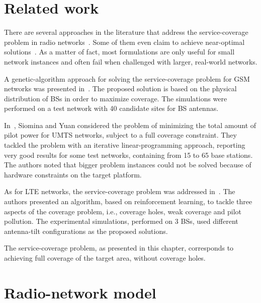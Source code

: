 \section{Related work \label{sec:06-Related-work}}

There are several approaches in the literature that address the service-coverage
problem in radio networks~\cite{Amaldi-Radio_planning_and_coverage_optimization_of_3G_networks:2008,Nawrocki-Understanding_UMTS_radio_network_modelling_and_optimisation:2006,Siomina_Pilot.power.optimization:2004}.
Some of them even claim to achieve near-optimal solutions~\cite{Siomina:Minimum.pilot.power.for.service.coverage}.
As a matter of fact, most formulations are only useful for small network
instances and often fail when challenged with larger, real-world networks.

A genetic-algorithm approach for solving the service-coverage problem
for GSM networks was presented in~\cite{Lieska-Radion_coverage_optimization_with_genetic_algorithms:1998}.
The proposed solution is based on the physical distribution of BSs
in order to maximize coverage. The simulations were performed on a
test network with 40 candidate sites for BS antennas.

In~\cite{Siomina:Minimum.pilot.power.for.service.coverage}, Siomina
and Yuan considered the problem of minimizing the total amount of
pilot power for UMTS networks, subject to a full coverage constraint.
They tackled the problem with an iterative linear-programming approach,
reporting very good results for some test networks, containing from
15 to 65 base stations. The authors noted that bigger problem instances
could not be solved because of hardware constraints on the target
platform.

As for LTE networks, the service-coverage problem was addressed in~\cite{Thampi-A_sparse_sampling_algorithm_for_self_optimization_of_coverage_in_LTE:2012}.
The authors presented an algorithm, based on reinforcement learning,
to tackle three aspects of the coverage problem, i.e., coverage holes,
weak coverage and pilot pollution. The experimental simulations, performed
on 3 BSs, used different antenna-tilt configurations as the proposed
solutions.

The service-coverage problem, as presented in this chapter, corresponds
to achieving full coverage of the target area, without coverage holes.


\section{Radio-network model \label{sec:06-Radio_network_model}}

